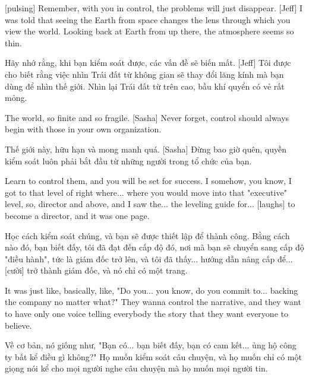 \documentclass[a4paper]{article}
\begin{document}
	[pulsing]
	Remember, with you in control, the problems will just disappear.
	[Jeff] I was told that seeing the Earth from space changes the lens through which you view the world.
	Looking back at Earth from up there, the atmosphere seems so thin.
	
	\begin{vietnamese-v2}
		Hãy nhớ rằng, khi bạn kiểm soát được, các vấn đề sẽ biến mất.
		[Jeff] Tôi được cho biết rằng việc nhìn Trái đất từ không gian sẽ thay đổi lăng kính mà bạn dùng để nhìn thế giới.
		Nhìn lại Trái đất từ trên cao, bầu khí quyển có vẻ rất mỏng.
	\end{vietnamese-v2}
	
	The world, so finite and so fragile.
	[Sasha] Never forget, control should always begin with those in your own organization.
	
	\begin{vietnamese-v2}
		Thế giới này, hữu hạn và mong manh quá.
		[Sasha] Đừng bao giờ quên, quyền kiểm soát luôn phải bắt đầu từ những người trong tổ chức của bạn.
	\end{vietnamese-v2}
	
	Learn to control them, and you will be set for success.
	I somehow, you know, I got to that level of right where... where you would move into that "executive" level, so, director and above, and I saw the... the leveling guide for... [laughs] to become a director, and it was one page.
	
	\begin{vietnamese-v2}
		Học cách kiểm soát chúng, và bạn sẽ được thiết lập để thành công.
		Bằng cách nào đó, bạn biết đấy, tôi đã đạt đến cấp độ đó, nơi mà bạn sẽ chuyển sang cấp độ "điều hành", tức là giám đốc trở lên, và tôi đã thấy... hướng dẫn nâng cấp để... [cười] trở thành giám đốc, và nó chỉ có một trang.
	\end{vietnamese-v2}
	
	It was just like, basically, like,
	"Do you... you know, do you commit to... backing the company no matter what?"
	They wanna control the narrative, and they want to have only one voice telling everybody the story that they want everyone to believe.
	
	\begin{vietnamese-v2}
		Về cơ bản, nó giống như,
		"Bạn có... bạn biết đấy, bạn có cam kết... ủng hộ công ty bất kể điều gì không?"
		Họ muốn kiểm soát câu chuyện, và họ muốn chỉ có một giọng nói kể cho mọi người nghe câu chuyện mà họ muốn mọi người tin.
	\end{vietnamese-v2}
	
\end{document}
